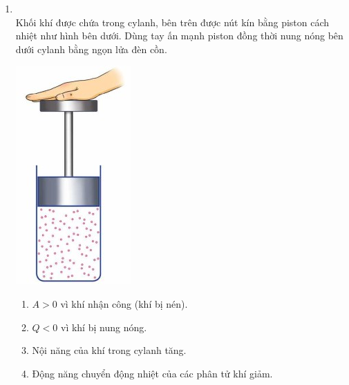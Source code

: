 \begin{enumerate}[label=\bfseries Câu \arabic*:, leftmargin=1.7cm]
	\item{}\\ 
	Khối khí được chứa trong cylanh, bên trên được nút kín bằng piston cách nhiệt như hình bên dưới. Dùng tay ấn mạnh piston đồng thời nung nóng bên dưới cylanh bằng ngọn lửa đèn cồn.
	\begin{center}
		\includegraphics[width=0.15\linewidth]{../figs/VN12-Y24-PH-SYL-003P-3}
	\end{center}
\begin{enumerate}[label=\alph*)]
	\item $A>0$ vì khí nhận công (khí bị nén).
	\item $Q<0$ vì khí bị nung nóng.
	\item Nội năng của khí trong cylanh tăng.
	\item Động năng chuyển động nhiệt của các phân tử khí giảm.
\end{enumerate}


\end{enumerate}
